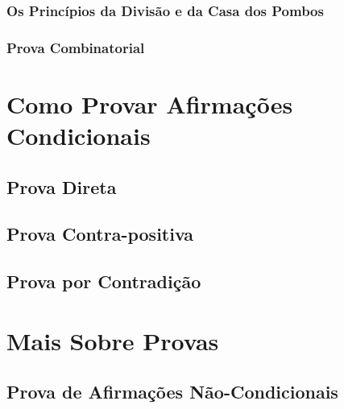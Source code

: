 \documentclass[a4paper,11pt]{book}
\theoremstyle{definition}
\theoremstyle{break}
\begin{document}
\section{Os Princípios da Divisão e da Casa dos Pombos}
\section{Prova Combinatorial}

\part{Como Provar Afirmações Condicionais}

\chapter{Prova Direta}

\chapter{Prova Contra-positiva}

\chapter{Prova por Contradição}


\part{Mais Sobre Provas}

\chapter{Prova de Afirmações Não-Condicionais}
\end{document}
